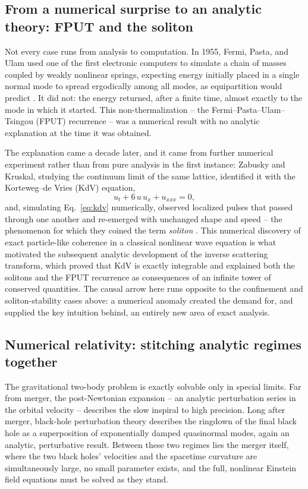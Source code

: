 \subsection{From a numerical surprise to an analytic theory: FPUT and the soliton}

Not every case runs from analysis to computation. In 1955, Fermi, Pasta, and
Ulam used one of the first electronic computers to simulate a chain of masses
coupled by weakly nonlinear springs, expecting energy initially placed in a
single normal mode to spread ergodically among all modes, as equipartition
would predict \cite{FermiPastaUlam1955}. It did not: the energy returned, after
a finite time, almost exactly to the mode in which it started. This
non-thermalization -- the Fermi--Pasta--Ulam--Tsingou (FPUT) recurrence -- was
a numerical result with no analytic explanation at the time it was obtained.

The explanation came a decade later, and it came from further numerical
experiment rather than from pure analysis in the first instance: Zabusky and
Kruskal, studying the continuum limit of the same lattice, identified it with
the Korteweg--de Vries (KdV) equation,
\begin{equation}
u_t + 6\,u\,u_x + u_{xxx} = 0,
\label{eq:kdv}
\end{equation}
and, simulating Eq.~\eqref{eq:kdv} numerically, observed localized pulses that
passed through one another and re-emerged with unchanged shape and speed -- the
phenomenon for which they coined the term \emph{soliton}
\cite{ZabuskyKruskal1965}. This numerical discovery of exact particle-like
coherence in a classical nonlinear wave equation is what motivated the
subsequent analytic development of the inverse scattering transform, which
proved that KdV is exactly integrable and explained both the solitons and the
FPUT recurrence as consequences of an infinite tower of conserved quantities.
The causal arrow here runs opposite to the confinement and soliton-stability
cases above: a numerical anomaly created the demand for, and supplied the key
intuition behind, an entirely new area of exact analysis.

\subsection{Numerical relativity: stitching analytic regimes together}

The gravitational two-body problem is exactly solvable only in special limits.
Far from merger, the post-Newtonian expansion -- an analytic perturbation
series in the orbital velocity -- describes the slow inspiral to high
precision. Long after merger, black-hole perturbation theory describes the
ringdown of the final black hole as a superposition of exponentially damped
quasinormal modes, again an analytic, perturbative result. Between these two
regimes lies the merger itself, where the two black holes' velocities and the
spacetime curvature are simultaneously large, no small parameter exists, and
the full, nonlinear Einstein field equations must be solved as they stand.

